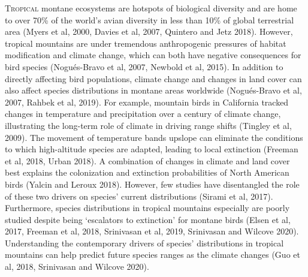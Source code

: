 
\lettrine{T}{ropical} montane ecosystems are hotspots of biological diversity and are home to over 70\% of the world's avian diversity in less than 10\% of global terrestrial area (Myers et al, 2000, Davies et al, 2007, Quintero and Jetz 2018).
However, tropical mountains are under tremendous anthropogenic pressures of habitat modification and climate change, which can both have negative consequences for bird species (Nogués-Bravo et al, 2007, Newbold et al, 2015).
In addition to directly affecting bird populations, climate change and changes in land cover can also affect species distributions in montane areas worldwide (Nogués-Bravo et al, 2007, Rahbek et al, 2019).
For example, mountain birds in California tracked changes in temperature and precipitation over a century of climate change, illustrating the long-term role of climate in driving range shifts (Tingley et al, 2009).
The movement of temperature bands upslope can eliminate the conditions to which high-altitude species are adapted, leading to local extinction (Freeman et al, 2018, Urban 2018).
A combination of changes in climate and land cover best explains the colonization and extinction probabilities of North American birds (Yalcin and Leroux 2018).
However, few studies have disentangled the role of these two drivers on species' current distributions (Sirami et al, 2017).
Furthermore, species distributions in tropical mountains especially are poorly studied despite being `escalators to extinction' for montane birds (Elsen et al, 2017, Freeman et al, 2018, Srinivasan et al, 2019, Srinivasan and Wilcove 2020).
Understanding the contemporary drivers of species' distributions in tropical mountains can help predict future species ranges as the climate changes (Guo et al, 2018, Srinivasan and Wilcove 2020).

